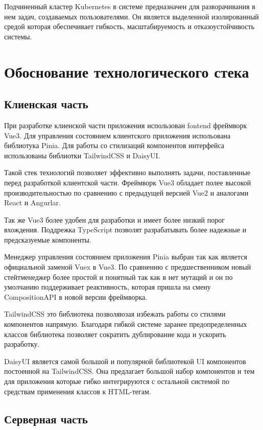 Подчиненный кластер Kubernetes в системе предназначен для разворачивания в нем задач, создаваемых пользователями. Он является выделенной изолированный средой которая обеспечивает гибкость, масштабируемость и отказоустойчивость системы.

\section{Обоснование технологического стека}

\subsection{Клиенская часть}

При разработке клиенской части приложения использован fontend фреймворк Vue3.
Для управления состоянием клиентского приложения испольована библиотука Pinia.
Для работы со стилизаций компонентов интерфейса использованы библиотки TailwindCSS и DaisyUI.

Такой стек технологий позволяет эффективно выполнять задачи, поставленные перед разработкой клиентской части.
Фреймворк Vue3 обладает полее высокой производительностью по сравнению с предыдущей версией Vue2 и аналогами React и Angurlar.

Так же Vue3 более удобен для разработки и имеет более низкий порог вхождения. Поддрежка TypeScript позволят разрабатывать более надежные и предсказуемые компоненты.

Менеджер управления состоянием приложения Pinia выбран так как является официальной заменой Vuex в Vue3. По сравнению с предшественником новый стейтменеджер более простой и понятный так как в нет мутаций и он по умолчанию поддерживает реактивность, которая пришла на смену CompositionAPI в новой версии фреймворка.

TailwindCSS это библиотека позволяюзая избежать работы со стилями компонентов напрямую. Благодаря гибкой системе заранее предопределенных классов библиотека позволяет сократить дублирование кода и ускорить разработку.

DaisyUI является самой большой и популярной библиотекой UI компонентов постоенной на TailwindCSS. Она предлагает большой набор компонентов и тем для приложения которые гибко интегрируются с остальной системой по средствам применения классов к HTML-тегам.

\subsection{Серверная часть}

